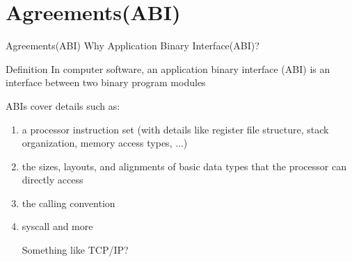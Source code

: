 \documentclass[UKenglish]{beamer}
\begin{document}
\section{Agreements(ABI)}
\begin{frame}{Agreements(ABI)}
  Why Application Binary Interface(ABI)?\\

 \begin{alertblock}{Definition}
In computer software, an application binary interface (ABI) is an interface between two binary program modules
\end{alertblock}
ABIs cover details such as:
\begin{enumerate}
\item a processor instruction set (with details like register file structure, stack
  organization, memory access types, ...)
\item the sizes, layouts, and alignments of basic data types that the processor can directly access
\item the calling convention
\item syscall and more\\
  \begin{center}
    \Large Something like TCP/IP?
  \end{center}
  
\end{enumerate}
\end{frame}
\end{document}
